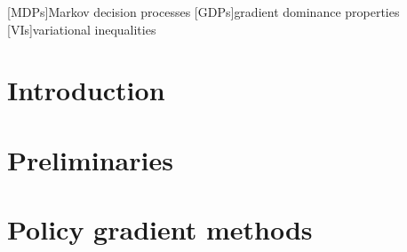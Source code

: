 \documentclass[reqno]{amsart}
\theoremstyle{plain}
\theoremstyle{definition}
\theoremstyle{remark}
\numberwithin{example}{section}		%
\begin{document}
[MDPs]{Markov decision processes}
[GDPs]{gradient dominance properties}
[VIs]{variational inequalities}

\begin{abstract}

\end{abstract}


\maketitle
\allowdisplaybreaks		%
\acresetall		%


\section{Introduction}
\label{sec:introduction}



\section{Preliminaries}
\label{sec:preliminaries}



\section{Policy gradient methods}
\label{sec:model}



\end{document}
